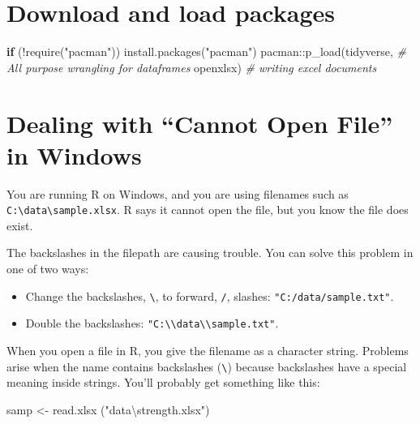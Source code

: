 \documentclass[
]{book}
\newenvironment{Shaded}{\begin{snugshade}}{\end{snugshade}}
\newcommand{\CommentTok}[1]{\textcolor[rgb]{0.56,0.35,0.01}{\textit{#1}}}
\newcommand{\ControlFlowTok}[1]{\textcolor[rgb]{0.13,0.29,0.53}{\textbf{#1}}}
\newcommand{\FunctionTok}[1]{\textcolor[rgb]{0.00,0.00,0.00}{#1}}
\newcommand{\NormalTok}[1]{#1}
\newcommand{\OtherTok}[1]{\textcolor[rgb]{0.56,0.35,0.01}{#1}}
\newcommand{\SpecialCharTok}[1]{\textcolor[rgb]{0.00,0.00,0.00}{#1}}
\newcommand{\StringTok}[1]{\textcolor[rgb]{0.31,0.60,0.02}{#1}}
\begin{document}
\hypertarget{download-and-load-packages-2}{%
\section*{Download and load packages}\label{download-and-load-packages-2}}

\begin{Shaded}
\begin{Highlighting}[]
\ControlFlowTok{if}\NormalTok{ (}\SpecialCharTok{!}\FunctionTok{require}\NormalTok{(}\StringTok{"pacman"}\NormalTok{)) }\FunctionTok{install.packages}\NormalTok{(}\StringTok{"pacman"}\NormalTok{)}
\NormalTok{pacman}\SpecialCharTok{::}\FunctionTok{p\_load}\NormalTok{(tidyverse, }\CommentTok{\# All purpose wrangling for dataframes}
\NormalTok{               openxlsx) }\CommentTok{\# writing excel documents}
\end{Highlighting}
\end{Shaded}

\hypertarget{dealing-with-cannot-open-file-in-windows}{%
\section{Dealing with ``Cannot Open File'' in Windows}\label{dealing-with-cannot-open-file-in-windows}}

You are running R on Windows, and you are using filenames such as \texttt{C:\textbackslash{}data\textbackslash{}sample.xlsx}. R says it cannot open the file, but you know the file does exist.

The backslashes in the filepath are causing trouble. You can solve this problem in one of two ways:

\begin{itemize}
\item
  Change the backslashes, \texttt{\textbackslash{}}, to forward, \texttt{/}, slashes: \texttt{"C:/data/sample.txt"}.
\item
  Double the backslashes: \texttt{"C:\textbackslash{}\textbackslash{}data\textbackslash{}\textbackslash{}sample.txt"}.
\end{itemize}

When you open a file in R, you give the filename as a character string. Problems arise when the name contains backslashes (\texttt{\textbackslash{}}) because backslashes have a special meaning inside strings. You'll probably get something like this:

\begin{Shaded}
\begin{Highlighting}[]
\NormalTok{samp }\OtherTok{\textless{}{-}} \FunctionTok{read.xlsx}\NormalTok{ (}\StringTok{"data\textbackslash{}strength.xlsx"}\NormalTok{)}
\end{Highlighting}
\end{Shaded}
\end{document}
